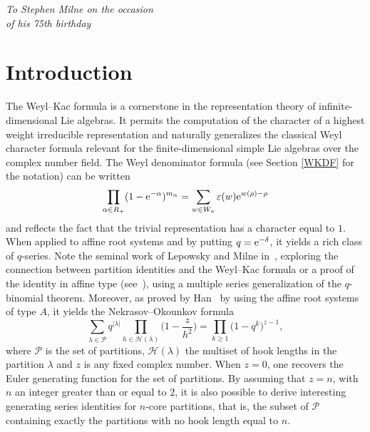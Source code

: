 \documentclass[pdftex]{sigma}
\numberwithin{equation}{section}
\begin{document}


\renewcommand{\thefootnote}{\arabic{footnote}}
\setcounter{footnote}{0}

\begin{flushright}
\begin{minipage}{58mm}
\it To Stephen Milne on the occasion\\ of his 75th birthday
\end{minipage}
\end{flushright}

\section{Introduction}

The Weyl--Kac formula is a cornerstone in the representation theory of
infinite-dimensional Lie algebras. It
permits the computation of the character of a highest weight irreducible
representation and naturally generalizes the classical Weyl character
formula relevant for the finite-dimensional simple Lie algebras over
the complex number field. The Weyl denominator formula (see Section \ref{WKDF} for the notation) can be written%
\begin{equation*}
\prod_{\alpha \in R_{+}}(1-{\rm e}^{-\alpha })^{m_{\alpha }}=\sum_{w\in
	W_{a}}\varepsilon (w){\rm e}^{w(\rho )-\rho }
\end{equation*}%
and reflects the fact that the trivial representation has a character equal
to $1$. When applied to affine root systems and by putting $q={\rm e}^{-\delta}$, it yields a rich class of $q$-series. Note  the seminal work of Lepowsky and Milne in~\cite{MilneLepowsky}, exploring the connection between partition identities and the Weyl--Kac formula or a proof of the identity in affine type  (see~\cite{Milne}), using a multiple series generalization of the $q$-binomial theorem. Moreover, as proved by Han~\cite{Ha} by using the affine
root systems of type $A$, it yields the Nekrasov--Okounkov
formula%
\begin{equation}\label{NOdebut}
\sum_{\lambda \in \mathcal{P}}q^{\vert \lambda \vert }\prod_{h\in
	\mathcal{H}(\lambda )}\biggl( 1-\frac{z}{h^{2}}\biggr) =\prod_{k\geq
	1}\bigl(1-q^{k}\bigr)^{z-1},
\end{equation}%
where $\mathcal{P}$ is the set of partitions, $\mathcal{H}(\lambda )$ the
multiset of hook lengths in the partition $\lambda $ and $z$ is any fixed
complex number. When $z=0$, one recovers the Euler
generating function for the set of partitions. By assuming that $z=n$, with $n
$ an integer greater than or equal to $2$, it is also possible to derive
interesting generating series identities for $n$-core partitions,
that is, the subset of $\mathcal{P}$ containing exactly the partitions with
no hook length equal to $n$.
\end{document}
